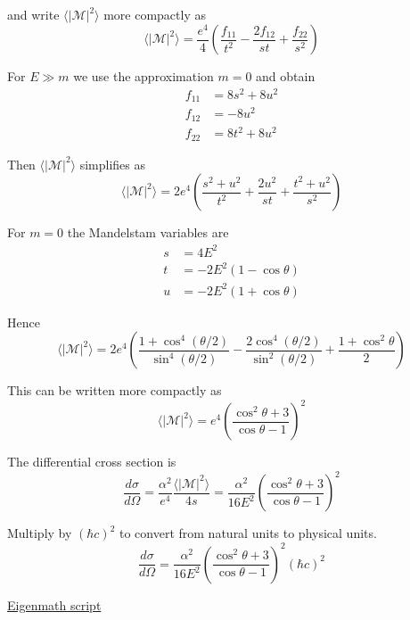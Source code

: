 and write $\langle|\mathcal{M}|^2\rangle$ more compactly as
\begin{equation*}
\langle|\mathcal{M}|^2\rangle=\frac{e^4}{4}
\left(\frac{f_{11}}{t^2}-\frac{2f_{12}}{st}+\frac{f_{22}}{s^2}\right)
\end{equation*}

For $E\gg m$ we use the approximation $m=0$ and obtain
\begin{align*}
f_{11}&=8s^2+8u^2
\\
f_{12}&=-8u^2
\\
f_{22}&=8t^2+8u^2
\end{align*}

Then $\langle|\mathcal{M}|^2\rangle$ simplifies as
\begin{equation*}
\langle|\mathcal{M}|^2\rangle
=2e^4\left(\frac{s^2+u^2}{t^2}+\frac{2u^2}{st}+\frac{t^2+u^2}{s^2}\right)
\end{equation*}

For $m=0$ the Mandelstam variables are
\begin{align*}
s&=4E^2
\\
t&=-2E^2(1-\cos\theta)
\\
u&=-2E^2(1+\cos\theta)
\end{align*}

Hence
\begin{equation*}
\langle|\mathcal{M}|^2\rangle
=2e^4\left(
\frac{1+\cos^4(\theta/2)}{\sin^4(\theta/2)}
-\frac{2\cos^4(\theta/2)}{\sin^2(\theta/2)}
+\frac{1+\cos^2\theta}{2}
\right)
\end{equation*}

This can be written more compactly as
\begin{equation*}
\langle|\mathcal{M}|^2\rangle=e^4\left(\frac{\cos^2\theta+3}{\cos\theta-1}\right)^2
\end{equation*}

The differential cross section is
\begin{equation*}
\frac{d\sigma}{d\Omega}
=\frac{\alpha^2}{e^4}\frac{\langle|\mathcal{M}|^2\rangle}{4s}
=\frac{\alpha^2}{16E^2}\left(\frac{\cos^2\theta+3}{\cos\theta-1}\right)^2
\end{equation*}

Multiply by $(\hbar c)^2$ to convert from natural units to physical units.
\begin{equation*}
\frac{d\sigma}{d\Omega}=\frac{\alpha^2}{16E^2}
\left(\frac{\cos^2\theta+3}{\cos\theta-1}\right)^2
(\hbar c)^2
\end{equation*}

\href{https://georgeweigt.github.io/examples/bhabha-scattering-1-demo.html}{Eigenmath script}


